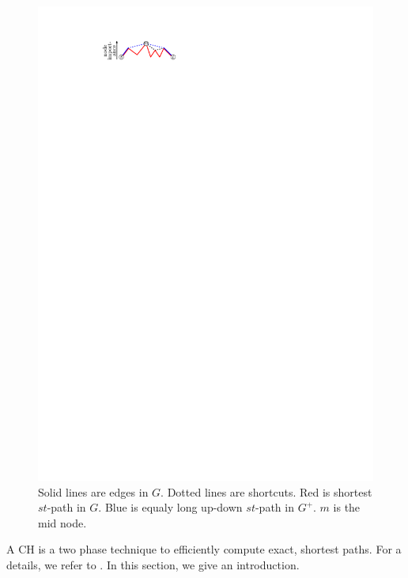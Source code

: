 \documentclass[a4paper,USenglish,cleveref, autoref, thm-restate]{lipics-v2019}
\begin{document}
\begin{figure}
\centering
\includegraphics{fig/ch}
\caption{
Solid lines are edges in $G$. Dotted lines are shortcuts. Red is shortest $st$-path in $G$. Blue is equaly long up-down $st$-path in $G^+$. $m$ is the mid node.
}
\label{fig:ch}
\end{figure}

A CH is a two phase technique to efficiently compute exact, shortest paths.
For a details, we refer to \cite{gssv-erlrn-12,dsw-cch-15}.
In this section, we give an introduction.
\end{document}

